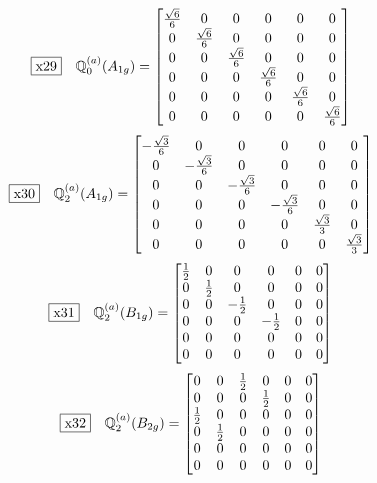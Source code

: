 \documentclass[fleqn,10pt,landscape]{jsarticle}
\begin{document}
\begin{dmath*}
\fbox{x29}\quad \mathbb{Q}_{0}^{(a)}(A_{1g})=\begin{bmatrix} \frac{\sqrt{6}}{6} & 0 & 0 & 0 & 0 & 0 \\ 0 & \frac{\sqrt{6}}{6} & 0 & 0 & 0 & 0 \\ 0 & 0 & \frac{\sqrt{6}}{6} & 0 & 0 & 0 \\ 0 & 0 & 0 & \frac{\sqrt{6}}{6} & 0 & 0 \\ 0 & 0 & 0 & 0 & \frac{\sqrt{6}}{6} & 0 \\ 0 & 0 & 0 & 0 & 0 & \frac{\sqrt{6}}{6} \end{bmatrix}
\end{dmath*}
\begin{dmath*}
\fbox{x30}\quad \mathbb{Q}_{2}^{(a)}(A_{1g})=\begin{bmatrix} - \frac{\sqrt{3}}{6} & 0 & 0 & 0 & 0 & 0 \\ 0 & - \frac{\sqrt{3}}{6} & 0 & 0 & 0 & 0 \\ 0 & 0 & - \frac{\sqrt{3}}{6} & 0 & 0 & 0 \\ 0 & 0 & 0 & - \frac{\sqrt{3}}{6} & 0 & 0 \\ 0 & 0 & 0 & 0 & \frac{\sqrt{3}}{3} & 0 \\ 0 & 0 & 0 & 0 & 0 & \frac{\sqrt{3}}{3} \end{bmatrix}
\end{dmath*}
\begin{dmath*}
\fbox{x31}\quad \mathbb{Q}_{2}^{(a)}(B_{1g})=\begin{bmatrix} \frac{1}{2} & 0 & 0 & 0 & 0 & 0 \\ 0 & \frac{1}{2} & 0 & 0 & 0 & 0 \\ 0 & 0 & - \frac{1}{2} & 0 & 0 & 0 \\ 0 & 0 & 0 & - \frac{1}{2} & 0 & 0 \\ 0 & 0 & 0 & 0 & 0 & 0 \\ 0 & 0 & 0 & 0 & 0 & 0 \end{bmatrix}
\end{dmath*}
\begin{dmath*}
\fbox{x32}\quad \mathbb{Q}_{2}^{(a)}(B_{2g})=\begin{bmatrix} 0 & 0 & \frac{1}{2} & 0 & 0 & 0 \\ 0 & 0 & 0 & \frac{1}{2} & 0 & 0 \\ \frac{1}{2} & 0 & 0 & 0 & 0 & 0 \\ 0 & \frac{1}{2} & 0 & 0 & 0 & 0 \\ 0 & 0 & 0 & 0 & 0 & 0 \\ 0 & 0 & 0 & 0 & 0 & 0 \end{bmatrix}
\end{dmath*}
\end{document}
